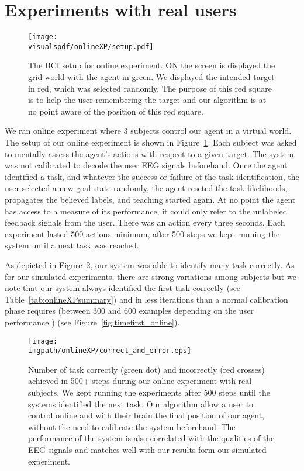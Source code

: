 \section{Experiments with real users}

\begin{figure}[!htbp]
\centering
\texttt{[image: \\visualspdf/onlineXP/setup.pdf]}
\caption{The BCI setup for online experiment. ON the screen is displayed the grid world with the agent in green. We displayed the intended target in red, which was selected randomly. The purpose of this red square is to help the user remembering the target and our algorithm is at no point aware of the position of this red square.}
\label{fig:BCIsetup}
\end{figure}

We ran online experiment where 3 subjects  control our agent in a virtual world. The setup of our online experiment is shown in Figure~\ref{fig:BCIsetup}. Each subject was asked to mentally assess the agent's actions with respect to a given target. The system was not calibrated to decode the user EEG signals beforehand. Once the agent identified a task, and whatever the success or failure of the task identification, the user selected a new goal state randomly, the agent reseted the task likelihoods, propagates the believed labels, and teaching started again. At no point the agent has access to a measure of its performance, it could only refer to the unlabeled feedback signals from the user. There was an action every three seconds. Each experiment lasted 500 actions minimum, after 500 steps we kept running the system until a next task was reached.

As depicted in Figure~\ref{fig:correcterror_online}, our system was able to identify many task correctly. As for our simulated experiments, there are strong variations among subjects but we note that our system  always identified the first task correctly (see Table~\ref{tab:onlineXPsummary}) and in less iterations than a normal calibration phase requires (between 300 and 600 examples depending on the user performance \cite{chavarriaga2010learning,iturrate2010single}) (see Figure~\ref{fig:timefirst_online}).


\begin{figure}[!htbp]
\centering
\texttt{[image: \\imgpath/onlineXP/correct\_and\_error.eps]}
\caption{Number of task correctly (green dot) and incorrectly (red crosses) achieved in 500+ steps during our online experiment with real subjects. We kept running the experiments after 500 steps until the systems identified the next task. Our algorithm allow a user to control online and with their brain the final position of our agent, without the need to calibrate the system beforehand. The performance of the system is also correlated with the qualities of the EEG signals and matches well with our results form our simulated experiment.}
\label{fig:correcterror_online}
\end{figure} 


